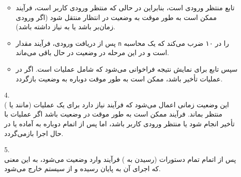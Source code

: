 \begin{qsolve}
	\begin{enumerate}
		\item [ ]
		\begin{itemize}
				\item 						تابع  منتظر ورودی است، بنابراین در حالی که منتظر ورودی کاربر است، فرآیند ممکن است به طور موقت به وضعیت در انتظار  منتقل شود (اگر ورودی زمان‌بر باشد یا به  نیاز داشته باشد).
		
				\item 						پس از دریافت ورودی، فرآیند مقدار \texttt{n} را در ۱۰ ضرب می‌کند که یک محاسبه است و در این مرحله در وضعیت در حال  باقی می‌ماند.
					
				\item 						سپس تابع  برای نمایش نتیجه فراخوانی می‌شود که شامل عملیات \lr{I/O} است. اگر در عملیات  تأخیر باشد، ممکن است به طور موقت دوباره به وضعیت  بازگردد.
					
	
			\end{itemize}
			
			\item [4.]
			\textbf{}\\					این وضعیت زمانی اعمال می‌شود که فرآیند نیاز دارد برای یک عملیات  (مانند  یا ) منتظر بماند. فرآیند ممکن است به طور موقت در وضعیت  باشد اگر عملیات  با تأخیر انجام شود یا منتظر ورودی کاربر باشد، اما پس از اتمام
			  دوباره به آماده یا در حال اجرا بازمی‌گردد.
			
			
			\item [5.]
			\textbf{}\\				پس از اتمام تمام دستورات (رسیدن به  ) فرآیند وارد وضعیت  می‌شود، به این معنی که اجرای آن به پایان رسیده و از سیستم خارج می‌شود.
		
		
		
\end{enumerate}
\end{qsolve}